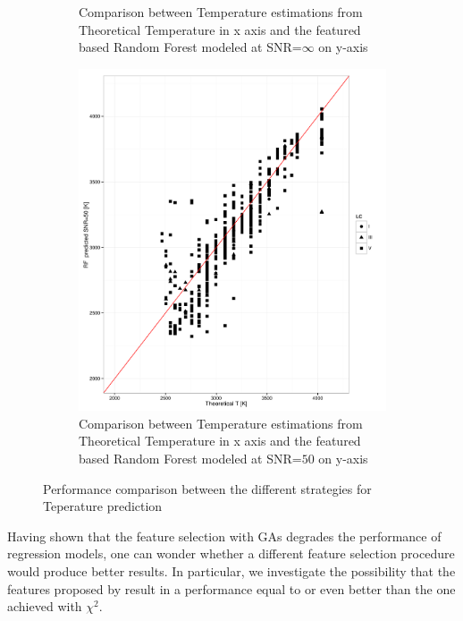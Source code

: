 \begin {figure}
\begin{subfigure}{.85\textwidth}
  \caption{Comparison between Temperature estimations from Theoretical Temperature 
  in x axis and the featured based Random Forest modeled at SNR=$\infty$ on y-axis}
 \label{fig:ipac_rfoo_lsb}
 \end{subfigure}
  \begin{subfigure}{.85\textwidth}
  \centering
  \includegraphics[width=11cm]{figs/ipac_T_RF50_LSB.pdf}
  \caption{Comparison between Temperature estimations from Theoretical Temperature 
  in x axis and the featured based Random Forest modeled at SNR=$50$ on y-axis}
 \label{fig:ipac_rf50_lsb}
 \end{subfigure}
 \label {fig:comp01}
 \caption{Performance comparison between the different strategies for Teperature prediction}
\end {figure}


Having shown that the feature selection with GAs degrades the
performance of regression models, one can wonder whether a different
feature selection procedure would produce better results. In
particular, we investigate the possibility that the features proposed
by \cite{cesetti} result in a performance equal to or even better than
the one achieved with $\chi^2$.

